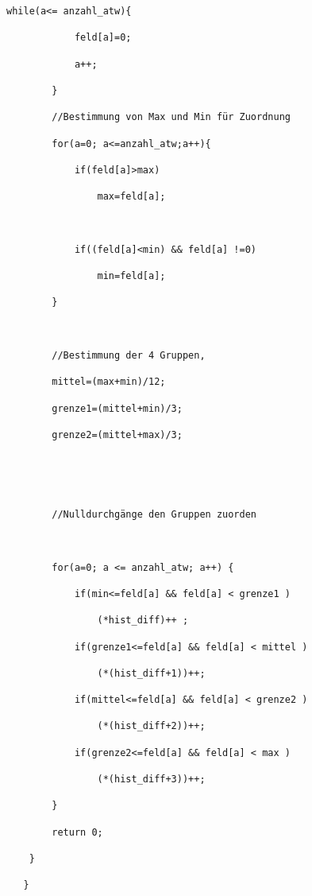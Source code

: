 \documentclass[a4paper,12pt]{article}
\begin{document}
\begin{lstlisting}[caption={histo.c}]
		while(a<= anzahl_atw){

			feld[a]=0;

			a++;

		}

		//Bestimmung von Max und Min für Zuordnung

		for(a=0; a<=anzahl_atw;a++){

			if(feld[a]>max)

				max=feld[a];



			if((feld[a]<min) && feld[a] !=0)

				min=feld[a];

		}



		//Bestimmung der 4 Gruppen,

		mittel=(max+min)/12;

		grenze1=(mittel+min)/3;

		grenze2=(mittel+max)/3;





		//Nulldurchgänge den Gruppen zuorden



		for(a=0; a <= anzahl_atw; a++) {

			if(min<=feld[a] && feld[a] < grenze1 )

				(*hist_diff)++ ;

			if(grenze1<=feld[a] && feld[a] < mittel )

				(*(hist_diff+1))++;

			if(mittel<=feld[a] && feld[a] < grenze2 )

				(*(hist_diff+2))++;

			if(grenze2<=feld[a] && feld[a] < max )

				(*(hist_diff+3))++;

		}

		return 0;

	}

   }
\end{lstlisting}
\end{document}
